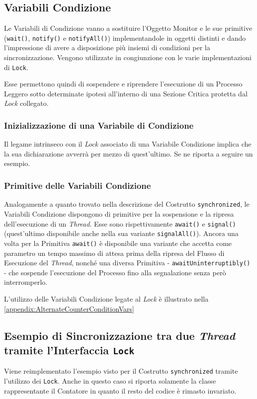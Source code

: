 \subsection{Variabili Condizione}
Le Variabili di Condizione\cite{Condition_JavaDocs} vanno a sostituire l'Oggetto Monitor e le sue primitive (\texttt{wait()}, \texttt{notify()} e \texttt{notifyAll()}) implementandole in oggetti distinti e dando l'impressione di avere a disposizione più insiemi di condizioni per la sincronizzazione. Vengono utilizzate in congiunzione con le varie implementazioni di \texttt{Lock}. \par
Esse permettono quindi di sospendere e riprendere l'esecuzione di un Processo Leggero sotto determinate ipotesi all'interno di una Sezione Critica protetta dal \textit{Lock} collegato.
\subsubsection{Inizializzazione di una Variabile di Condizione}
Il legame intrinseco con il \textit{Lock} associato di una Variabile Condizione implica che la sua dichiarazione avverrà per mezzo di quest'ultimo. Se ne riporta a seguire un esempio.

\subsubsection{Primitive delle Variabili Condizione}
Analogamente a quanto trovato nella descrizione del Costrutto \texttt{synchronized}, le Variabili Condizione dispongono di primitive per la sospensione e la ripresa dell'esecuzione di un \textit{Thread}. Esse sono rispettivamente \texttt{await()} e \texttt{signal()} (quest'ultimo disponibile anche nella sua variante \texttt{signalAll()}). Ancora una volta per la Primitiva \texttt{await()} è disponibile una variante che accetta come parametro un tempo massimo di attesa prima della ripresa del Flusso di Esecuzione del \textit{Thread}, nonché una diversa Primitiva - \texttt{awaitUninterruptibly()} - che sospende l'esecuzione del Processo fino alla segnalazione senza però interromperlo. \par
L'utilizzo delle Variabili Condizione legate al \textit{Lock} è illustrato nella \autoref{appendix:AlternateCounterConditionVars}
\subsection{Esempio di Sincronizzazione tra due \textit{Thread} tramite l'Interfaccia \texttt{Lock}}
Viene reimplementato l'esempio visto per il Costrutto \texttt{synchronized} tramite l'utilizzo dei \texttt{Lock}. Anche in questo caso si riporta solamente la classe rappresentante il Contatore in quanto il resto del codice è rimasto invariato.


